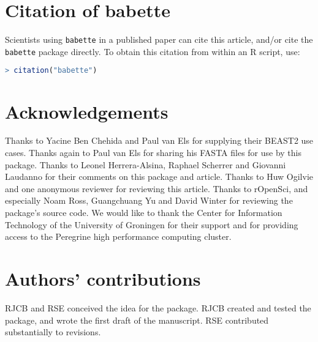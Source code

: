 \documentclass{article}
\begin{document}
\section{Citation of babette}

Scientists using \verb;babette; in a published paper can cite this
article, and/or cite the \verb;babette; package 
directly. To obtain this citation from within an R script, use:

\begin{lstlisting}[language=R]
> citation("babette")
\end{lstlisting}

\section{Acknowledgements}

Thanks to Yacine Ben Chehida and Paul van Els for supplying their 
BEAST2 use cases. Thanks again to Paul van Els for sharing his FASTA files 
for use by this package. Thanks to Leonel Herrera-Alsina, Raphael Scherrer 
and Giovanni Laudanno for their comments on this package and article.
Thanks to Huw Ogilvie and one anonymous reviewer for reviewing this article.
Thanks to rOpenSci, and especially Noam Ross, Guangchuang Yu and 
David Winter for reviewing the package's source code.
We would like to thank the Center for Information Technology of the University 
of Groningen for their support and for providing access to the Peregrine 
high performance computing cluster.

\section{Authors' contributions}

RJCB and RSE conceived the idea for the package. RJCB created and tested the package, and wrote the first draft of the manuscript. RSE contributed substantially to revisions.



\end{document}
